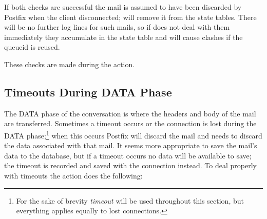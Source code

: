 If both checks are successful the mail is assumed to have been discarded by
Postfix when the client disconnected; \parsername{} will remove it from the
state tables.  There will be no further log lines for such mails, so if
\parsername{} does not deal with them immediately they accumulate in the
state table and will cause clashes if the queueid is reused.

These checks are made during the  action.

\subsection{Timeouts During DATA Phase}

\label{timeouts during data phase}

The DATA phase of the  conversation is where the headers and
body of the mail are transferred.  Sometimes a timeout occurs or the
connection is lost during the DATA phase;\footnote{For the sake of brevity
\textit{timeout\/} will be used throughout this section, but everything
applies equally to lost connections.} when this occurs Postfix will discard
the mail and \parsername{} needs to discard the data associated with that
mail.  It seems more appropriate to save the mail's data to the database,
but if a timeout occurs no data will be available to save; the timeout is
recorded and saved with the connection instead.  To deal properly with
timeouts the  action does the following:

